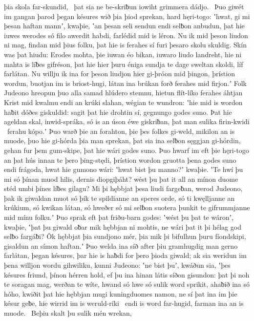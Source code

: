 þia skola far-skundid, \hld\ þat sia ne be-skriƀun iowiht
grimmera dádjo. \hld\ Þuo giwét im gangan þarod
þegan késures wið þia þiod sprekan,
hard hęri-togo: ʽhwat, gi mi þesan haftan mannʼ, kwaþie,
ʽan þesan seli sendun endi selƀon anbudun,
þat hie iuwes werodes só filo awerdit habdi,
farlédid mid is léron. Nu ik mid þeson liudon ni mag,
findan mid þius folku, þat hie is ferahes sí
furi þesaro skolu skuldig. Skín was þat hiudu:
Erodes mohta, þie iuwan éo bikan,
iuwaro liudo landreht, hie ni mahta is líƀes gifréson,
þat hie hier þuru éniga sundja te dage sweltan skoldi,
líf farlátan. Nu willju ik ina for þeson liudjon hier
gi-þróon mid þingon, þrístion wordun,
buotjan im is briost-hugi, látan ina brúkan forð
ferahes mid firjon.ʼ Folk Judeono
hreopun þuo alla samad hlúdero stemnu,
hietun flít-líko ferahes áhtjan
Krist mid kwalmu endi an krúki slahan,
wégian te wundron: ʽhie mid is wordon haƀit
dóðes giskuldid: sagit þat hie drohtin sí,
gegnungo godes suno. Þat hie ageldan skal,
inwid-spráka, só is an úson éwe giskriƀan,
þat man sulika firin-kwidi \hld\ ferahu kópo.ʼ
Þuo warð þie an forahton, þie þes folkes gi-weld,
mikilon an is muode, þuo hie gi-hórda þia man sprekan,
þat sia ina selƀon sęggjan gi-hórdin,
gehan fur þem gum-skipe, þat hie wári godes suno.
Þuo hwarf im eft þie hęri-togo an þat hús innan
te þero þing-stędi, þrístion wordon
gruotta þena godes suno endi frágoda, hwat hie gumono wári:
ʽhwat bist þu manno?ʼ kwaþie. ʽTe hwí þu mi só þínan muod hilis,
dernis diopgiþáht? wést þu þat it all an mínon duome stéd
umbi þínes líƀes gilagu? Mi þi hębbjat þesa liudi fargeƀan,
werod Judeono, þak ik giwaldan muot
só þik te spildianne an speres orde,
só ti kwęlljanne an krúkium, só kwikan látan,
só hweðer só mi selƀon suotera þunkit
te gifrummjanne mid mínu folku.ʼ Þuo sprak eft þat friðu-barn godes:
ʽwést þu þat te wáronʼ, kwaþie, ʽþat þu giwald oƀar mik
hębbjan ni mohtis, ne wári þat it þi hélag god
selƀo fargáƀi? Ôk hębbjat þia sundjono mér,
þia mik þi bifulhun þuru fíondskipi,
gisaldun an símon haftan.ʼ Þuo welda ina síð after þiu
gramhugdig man gerno farlátan,
þegan késures, þar hie is haƀdi for þero þioda giwald;
ak sia weridun im þena willjon wordu gihwiliku,
kunni Judeono: ʽne bist þuʼ, kwáðun sia, ʽþes késures friund,
þínon hérren hold, ef þu ina hinan látis
síðon gisundon: þat þi noh te soragan mag,
werðan te wíte, hwand só hwe só sulik word sprikit,
ahaƀið ina só hóho, kwiðit þat hie hębbjan mugi
kuningduomes namon, ne sí þat ina im þie késur geƀe,
hie wirrid im is weruld-ríki \hld\ endi is word far-hugid,
farman ina an is muode. \hld\ Beþiu skalt þu sulik mén wrekan,
